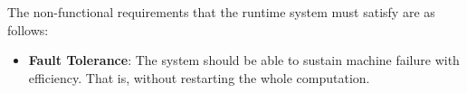 The non-functional requirements that the runtime system must satisfy are as follows:

\begin{itemize}
  \item \textbf{Fault Tolerance}: The system should be able to sustain machine failure with efficiency. That is, without restarting the whole computation.
\end{itemize}




